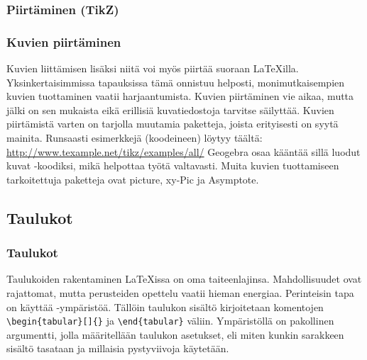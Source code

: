 \subsubsection{Piirtäminen (TikZ)}
\begin{frame}[fragile]
    \frametitle{Kuvien piirtäminen}
    Kuvien liittämisen lisäksi niitä voi myös piirtää suoraan \LaTeX illa. Yksinkertaisimmissa tapauksissa tämä onnistuu helposti, monimutkaisempien kuvien tuottaminen vaatii harjaantumista.
    \vaihto
    Kuvien piirtäminen vie aikaa, mutta jälki on sen mukaista eikä erillisiä kuvatiedostoja tarvitse säilyttää.
    \vaihto Kuvien piirtämistä varten on tarjolla muutamia paketteja, joista erityisesti \TikZ{} on syytä mainita. Runsaasti esimerkkejä (koodeineen) löytyy täältä: \url{http://www.texample.net/tikz/examples/all/}
    \vaihto Geogebra osaa kääntää sillä luodut kuvat \TikZ-koodiksi, mikä helpottaa työtä valtavasti.
    \vaihto Muita kuvien tuottamiseen tarkoitettuja paketteja ovat picture, xy-Pic ja Asymptote.
\end{frame}

\begin{frame}[fragile]
    
    
\end{frame}


\subsection{Taulukot}
\begin{frame}[fragile]
    \frametitle{Taulukot}
    Taulukoiden rakentaminen \LaTeX issa on oma taiteenlajinsa. Mahdollisuudet ovat rajattomat, mutta perusteiden opettelu vaatii hieman energiaa. 
    \vaihto
Perinteisin tapa on käyttää -ympäristöä. Tällöin taulukon sisältö kirjoitetaan komentojen \lstinline-\begin{tabular}[]{}- ja \lstinline-\end{tabular}- väliin.
    \vaihto
    Ympäristöllä on pakollinen argumentti, jolla määritellään taulukon asetukset, eli miten kunkin sarakkeen sisältö tasataan ja millaisia pystyviivoja käytetään.
\end{frame}




